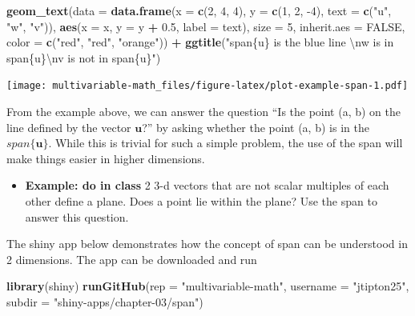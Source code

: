 \documentclass[
]{book}
\newenvironment{Shaded}{\begin{snugshade}}{\end{snugshade}}
\newcommand{\CharTok}[1]{\textcolor[rgb]{0.31,0.60,0.02}{#1}}
\newcommand{\DataTypeTok}[1]{\textcolor[rgb]{0.13,0.29,0.53}{#1}}
\newcommand{\DecValTok}[1]{\textcolor[rgb]{0.00,0.00,0.81}{#1}}
\newcommand{\FloatTok}[1]{\textcolor[rgb]{0.00,0.00,0.81}{#1}}
\newcommand{\KeywordTok}[1]{\textcolor[rgb]{0.13,0.29,0.53}{\textbf{#1}}}
\newcommand{\NormalTok}[1]{#1}
\newcommand{\OperatorTok}[1]{\textcolor[rgb]{0.81,0.36,0.00}{\textbf{#1}}}
\newcommand{\OtherTok}[1]{\textcolor[rgb]{0.56,0.35,0.01}{#1}}
\newcommand{\StringTok}[1]{\textcolor[rgb]{0.31,0.60,0.02}{#1}}
\providecommand{\tightlist}{%
  \setlength{\itemsep}{0pt}\setlength{\parskip}{0pt}}
\theoremstyle{definition}
\theoremstyle{definition}
\theoremstyle{definition}
\theoremstyle{definition}
\theoremstyle{remark}
\begin{document}
\begin{Shaded}
\begin{Highlighting}[]
\StringTok{    }\KeywordTok{geom_text}\NormalTok{(}\DataTypeTok{data =} \KeywordTok{data.frame}\NormalTok{(}\DataTypeTok{x =} \KeywordTok{c}\NormalTok{(}\DecValTok{2}\NormalTok{, }\DecValTok{4}\NormalTok{, }\DecValTok{4}\NormalTok{),  }\DataTypeTok{y =} \KeywordTok{c}\NormalTok{(}\DecValTok{1}\NormalTok{, }\DecValTok{2}\NormalTok{, }\DecValTok{-4}\NormalTok{), }\DataTypeTok{text =} \KeywordTok{c}\NormalTok{(}\StringTok{"u"}\NormalTok{, }\StringTok{"w"}\NormalTok{, }\StringTok{"v"}\NormalTok{)),}
              \KeywordTok{aes}\NormalTok{(}\DataTypeTok{x =}\NormalTok{ x, }\DataTypeTok{y =}\NormalTok{ y }\OperatorTok{+}\StringTok{ }\FloatTok{0.5}\NormalTok{, }\DataTypeTok{label =}\NormalTok{ text), }\DataTypeTok{size =} \DecValTok{5}\NormalTok{, }\DataTypeTok{inherit.aes =} \OtherTok{FALSE}\NormalTok{,}
              \DataTypeTok{color =} \KeywordTok{c}\NormalTok{(}\StringTok{"red"}\NormalTok{, }\StringTok{"red"}\NormalTok{, }\StringTok{"orange"}\NormalTok{)) }\OperatorTok{+}
\StringTok{    }\KeywordTok{ggtitle}\NormalTok{(}\StringTok{"span\{u\} is the blue line }\CharTok{\textbackslash{}n}\StringTok{w is in span\{u\}}\CharTok{\textbackslash{}n}\StringTok{v is not in span\{u\}"}\NormalTok{)}
\end{Highlighting}
\end{Shaded}

\texttt{[image: multivariable-math\_files/figure-latex/plot-example-span-1.pdf]}

From the example above, we can answer the question ``Is the point (a, b) on the line defined by the vector \(\mathbf{u}\)?'' by asking whether the point (a, b) is in the \(span\{\mathbf{u}\}\). While this is trivial for such a simple problem, the use of the span will make things easier in higher dimensions.

\begin{itemize}
\tightlist
\item
  \textbf{Example: do in class} 2 3-d vectors that are not scalar multiples of each other define a plane. Does a point lie within the plane? Use the span to answer this question.
\end{itemize}

The shiny app below demonstrates how the concept of span can be understood in 2 dimensions. The app can be downloaded and run

\begin{Shaded}
\begin{Highlighting}[]
\KeywordTok{library}\NormalTok{(shiny)}
\KeywordTok{runGitHub}\NormalTok{(}\DataTypeTok{rep =} \StringTok{"multivariable-math"}\NormalTok{,}
          \DataTypeTok{username =} \StringTok{"jtipton25"}\NormalTok{, }
          \DataTypeTok{subdir =} \StringTok{"shiny-apps/chapter-03/span"}\NormalTok{) }
\end{Highlighting}
\end{Shaded}
\end{document}
